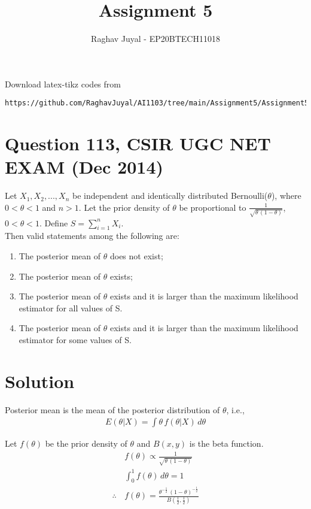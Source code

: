 \documentclass[journal,12pt,twocolumn]{IEEEtran}
\begin{document}
\let\vec\mathbf
\renewcommand{\thefigure}{\theproblem}
\def\putbox#1#2#3{\makebox[0in][l]{\makebox[#1][l]{}\raisebox{\baselineskip}[0in][0in]{\raisebox{#2}[0in][0in]{#3}}}}
     \def\rightbox#1{\makebox[0in][r]{#1}}
     \def\centbox#1{\makebox[0in]{#1}}
     \def\topbox#1{\raisebox{-\baselineskip}[0in][0in]{#1}}
     \def\midbox#1{\raisebox{-0.5\baselineskip}[0in][0in]{#1}}
\vspace{3cm}
\title{Assignment 5}
\author{Raghav Juyal - EP20BTECH11018}
\maketitle
\newpage
\bigskip
\renewcommand{\thefigure}{\theenumi}
\renewcommand{\thetable}{\theenumi}
Download latex-tikz codes from 
%
\begin{lstlisting}
https://github.com/RaghavJuyal/AI1103/tree/main/Assignment5/Assignment5.tex
\end{lstlisting}
\section*{Question 113, CSIR UGC NET EXAM (Dec 2014)}
Let $X_1,X_2,...,X_n$ be independent and identically distributed Bernoulli($\theta$), where $0<\theta<1$ and $n>1$. Let the prior density of $\theta$ be proportional to $\frac{1}{\sqrt{\theta\,(1-\theta)}}$, $0<\theta<1$. Define $S=\sum_{i=1}^nX_i$.\\[1pt] Then valid statements among the following are:
\begin{enumerate}[label = \arabic*.]
    \item The posterior mean of $\theta$ does not exist;
    \item The posterior mean of $\theta$ exists;
    \item The posterior mean of $\theta$ exists and it is larger than the maximum likelihood estimator for all values of S.
    \item The posterior mean of $\theta$ exists and it is larger than the maximum likelihood estimator for some values of S.
\end{enumerate}
\section*{Solution}
\begin{definition}
Posterior mean is the mean of the posterior distribution of $\theta$, i.e., 
\begin{align}
    E(\theta|X) = \int{\theta\,f(\theta|X)\,d\theta}\label{eq5}
\end{align}

\end{definition}
Let $f(\theta)$ be the prior density of $\theta$ and $B(x,y)$ is the beta function.
\begin{align}
    &f(\theta) \propto \frac{1}{\sqrt{\theta\,(1-\theta)}}\\
    &\int_0^1 f(\theta)\,d\theta = 1\nonumber\\
    \therefore\, &f(\theta) = \frac{\theta^{-\frac{1}{2}}\,(1-\theta)^{-\frac{1}{2}}}{B(\frac{1}{2},\frac{1}{2})}\label{eq6}
\end{align}
\end{document}
